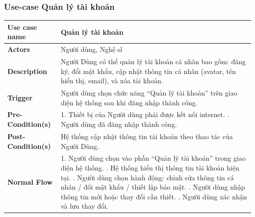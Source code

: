 \documentclass[a4paper]{article}
\begin{document}
\subsubsection{Use-case Quản lý tài khoản}
\begin{table}[H]
	\centering
	\renewcommand{\arraystretch}{1.3} %
	\begin{tabularx}{\textwidth}{|l|X|}
		\hline
		\textbf{Use case name} & Quản lý tài khoản                                                                                                                                       \\ \hline
		\textbf{Actors}        & Người dùng, Nghệ sĩ                                                                                                                                     \\ \hline
		\textbf{Description}   & Người Dùng có thể quản lý tài khoản cá nhân bao gồm: đăng ký, đổi mật khẩu, cập nhật thông tin cá nhân (avatar, tên hiển thị, email), và xóa tài khoản. \\ \hline
		\textbf{Trigger}       & Người dùng chọn chức năng “Quản lý tài khoản” trên giao diện hệ thống sau khi đăng nhập thành công.                                                     \\ \hline
		\textbf{Pre-Condition(s)}
		                       & 1. Thiết bị của Người dùng phải được kết nối internet. \newline
		2. Người dùng đã đăng nhập thành công.                                                                                                                                           \\ \hline
		\textbf{Post-Condition(s)}
		                       & Hệ thống cập nhật thông tin tài khoản theo thao tác của Người Dùng.                                                                                     \\ \hline
		\textbf{Normal Flow}
		                       & 1. Người dùng chọn vào phần “Quản lý tài khoản” trong giao diện hệ thống. \newline
		2. Hệ thống hiển thị thông tin tài khoản hiện tại. \newline
		3. Người dùng chọn hành động: chỉnh sửa thông tin cá nhân / đổi mật khẩu / thiết lập bảo mật. \newline
		4. Người dùng nhập thông tin mới hoặc thay đổi cần thiết. \newline
		5. Người dùng xác nhận và lưu thay đổi. \newline

\end{tabularx}
\end{table}
\end{document}

